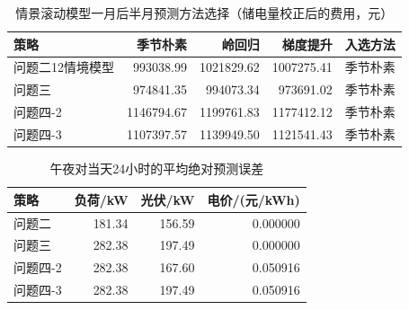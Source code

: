 \begin{table}[H]\centering\small\caption{情景滚动模型一月后半月预测方法选择（储电量校正后的费用，元）}
\begin{tabular}{lrrrl}\toprule
策略 & 季节朴素 & 岭回归 & 梯度提升 & 入选方法\\\midrule
问题二12情境模型 & 993038.99 & 1021829.62 & 1007275.41 & 季节朴素\\
问题三 & 974841.35 & 994073.34 & 973691.02 & 季节朴素\\
问题四-2 & 1146794.67 & 1199761.83 & 1177412.12 & 季节朴素\\
问题四-3 & 1107397.57 & 1139949.50 & 1121541.43 & 季节朴素\\
\bottomrule\end{tabular}\end{table}
\begin{table}[H]\centering\small\caption{午夜对当天24小时的平均绝对预测误差}
\begin{tabular}{lrrr}\toprule
策略 & 负荷/kW & 光伏/kW & 电价/(元/kWh)\\\midrule
问题二 & 181.34 & 156.59 & 0.000000\\
问题三 & 282.38 & 197.49 & 0.000000\\
问题四-2 & 282.38 & 167.60 & 0.050916\\
问题四-3 & 282.38 & 197.49 & 0.050916\\
\bottomrule\end{tabular}\end{table}
